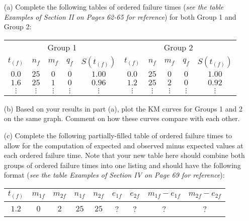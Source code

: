 \documentclass[12pt]{article}
\begin{document}
\begin{itemize}
	\item[(a)] Complete the following tables of ordered failure times (\textit{see the table Examples of Section II on Pages 62-65 for reference}) for both Group 1 and Group 2:
	
\begin{center}
\begin{tabular}{ c c c c c | c c c c c }
 \multicolumn{5}{c}{Group 1} & \multicolumn{5}{c}{Group 2} \\
 
 $t_{(f)}$ & $n_f$ & $m_{f}$ & $q_{f}$ & $S(t_{(f)})$   & $t_{(f)}$ & $n_f$ & $m_{f}$ & $q_{f}$ & $S(t_{(f)})$ \\
 
 \hline
 
 $0.0$ & $25$ & $0$ & $0$ & $1.00$    & $0.0$ & $25$ & $0$ & $0$ & $1.00$ \\
 
 $1.6$ & $25$ & $1$ & $0$ & $0.96$    & $1.2$ & $25$ & $2$ & $0$ & $0.92$ \\
 
 $\vdots$ & $\vdots$ & $\vdots$ & $\vdots$ & $\vdots$    & $\vdots$ & $\vdots$ & $\vdots$ & $\vdots$ & $\vdots$
\end{tabular}
\end{center}

	\item[(b)] Based on your results in part (a), plot the KM curves for Groups 1 and 2 on the same graph. Comment on how these curves compare with each other.
	
	\item[(c)] Complete the following partially-filled table of ordered failure times to allow for the computation of expected and observed minus expected values at each ordered failure time. Note that your new table here should combine both groups of ordered failure times into one listing and should have the following format (\textit{see the table Examples of Section IV on Page 69 for reference}):
	
	\begin{center}
\begin{tabular}{ c | c c | c c | c c | c c }
 
 $t_{(f)}$ & $m_{1f}$ & $m_{2f}$ & $n_{1f}$ & $n_{2f}$   & $e_{1f}$ & $e_{2f}$ & $m_{1f} - e_{1f}$ & $m_{2f} - e_{2f}$ \\
 
 \hline
 
 $1.2$ & $0$ & $2$ & $25$ & $25$    & ? & ? & ? & ? \\
 

\end{tabular}
\end{center}
\end{itemize}
\end{document}
